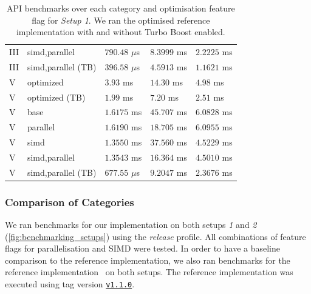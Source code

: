 \documentclass[11pt]{report}
\theoremstyle{definition}
\theoremstyle{plain}
\begin{document}
\begin{table}[H]
\begin{tabular}{l|l|lll}
    III                          & simd,parallel                 & $790.48$ $\mu$s & $8.3999$ ms & $2.2225$ ms     \\
    III                          & simd,parallel (TB)            & $396.58$ $\mu$s & $4.5913$ ms & $1.1621$ ms     \\
    \hline
    V \cite{aguilar2023return}   & optimized                     & $3.93$ ms       & $14.30$ ms  & $4.98$ ms       \\
    V \cite{aguilar2023return}   & optimized (TB)                & $1.99$ ms       & $7.20$ ms   & $2.51$ ms       \\
    \arrayrulecolor{lightgray}\hline\arrayrulecolor{black}
    V                            & base                          & $1.6175$ ms     & $45.707$ ms & $6.0828$ ms     \\
    V                            & parallel                      & $1.6190$ ms     & $18.705$ ms & $6.0955$ ms     \\
    V                            & simd                          & $1.3550$ ms     & $37.560$ ms & $4.5229$ ms     \\
    V                            & simd,parallel                 & $1.3543$ ms     & $16.364$ ms & $4.5010$ ms     \\
    V                            & simd,parallel (TB)            & $677.55$ $\mu$s & $9.2047$ ms & $2.3676$ ms     \\
    \hline
  \end{tabular}
  \caption{API benchmarks over each category and optimisation feature flag for \textit{Setup 1}. We ran the optimised reference implementation \cite{aguilar2023return} with and without Turbo Boost enabled.}
  \label{tab:api_dell_results}
\end{table}

\subsubsection{Comparison of Categories}\label{sub:comparison_categories}

We ran benchmarks for our implementation on both setups \textit{1} and \textit{2} (\autoref{fig:benchmarking_setups}) using the \textit{release} profile. All combinations of feature flags for parallelisation and SIMD were tested. In order to have a baseline comparison to the reference implementation, we also ran benchmarks for the reference implementation~\cite{aguilar2023return} on both setups. The reference implementation was executed using tag version \href{https://github.com/sdith/sdith/releases/tag/v1.1.0}{\texttt{v1.1.0}}.
\end{document}
